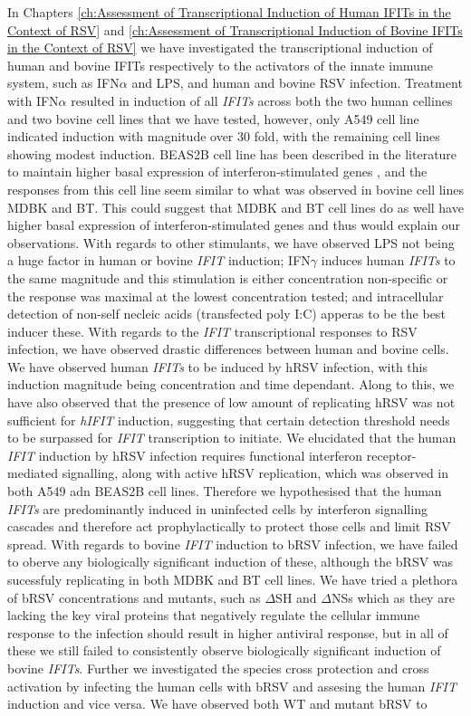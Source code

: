 In Chapters \ref{ch:Assessment of Transcriptional Induction of Human IFITs in the Context of RSV} and \ref{ch:Assessment of Transcriptional Induction of Bovine IFITs in the Context of RSV} we have investigated the transcriptional induction of human and bovine IFITs respectively to the activators of the innate immune system, such as IFN\(\alpha\) and LPS, and human and bovine RSV infection. Treatment with IFN\(\alpha\) resulted in induction of all \textit{IFITs} across both the two human cellines and two bovine cell lines that we have tested, however, only A549 cell line indicated induction with magnitude over 30 fold, with the remaining cell lines showing modest induction. BEAS2B cell line has been described in the literature to maintain higher basal expression of interferon-stimulated genes \cite{Seng2014HighResistance}, and the responses from this cell line seem similar to what was observed in bovine cell lines MDBK and BT. This could suggest that MDBK and BT cell lines do as well have higher basal expression of interferon-stimulated genes and thus would explain our observations. With regards to other stimulants, we have observed LPS not being a huge factor in human or bovine \textit{IFIT} induction; IFN\(\gamma\) induces human \textit{IFITs} to the same magnitude and this stimulation is either concentration non-specific or the response was maximal at the lowest concentration tested; and intracellular detection of non-self necleic acids (transfected poly I:C) apperas to be the best inducer these. With regards to the \textit{IFIT} transcriptional responses to RSV infection, we have observed drastic differences between human and bovine cells. We have observed human \textit{IFITs} to be induced by hRSV infection, with this induction magnitude being concentration and time dependant. Along to this, we have also observed that the presence of low amount of replicating hRSV was not sufficient for \textit{hIFIT} induction, suggesting that certain detection threshold needs to be surpassed for \textit{IFIT} transcription to initiate. We elucidated that the human \textit{IFIT} induction by hRSV infection requires functional interferon receptor-mediated signalling, along with active hRSV replication, which was observed in both A549 adn BEAS2B cell lines. Therefore we hypothesised that the human \textit{IFITs} are predominantly induced in uninfected cells by interferon signalling cascades and therefore act prophylactically to protect those cells and limit RSV spread. With regards to bovine \textit{IFIT} induction to bRSV infection, we have failed to oberve any biologically significant induction of these, although the bRSV was sucessfuly replicating in both MDBK and BT cell lines. We have tried a plethora of bRSV concentrations and mutants, such as $\Delta$SH and $\Delta$NSs which as they are lacking the key viral proteins that negatively regulate the cellular immune response to the infection should result in higher antiviral response, but in all of these we still failed to consistently observe biologically significant induction of bovine \textit{IFITs}. Further we investigated the species cross protection and cross activation by infecting the human cells with bRSV and assesing the human \textit{IFIT} induction and vice versa. We have observed both WT and mutant bRSV to 